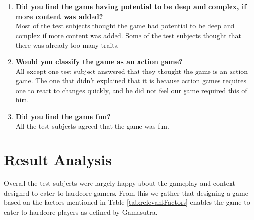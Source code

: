 \begin{enumerate}
\item \textbf{Did you find the game having potential to be deep and complex, if more content was added?}\vspace{4pt}\\
Most of the test subjects thought the game had potential to be deep and complex if more content was added.
Some of the test subjects thought that there was already too many traits.

\item \textbf{Would you classify the game as an action game?}\vspace{4pt}\\
All except one test subject answered that they thought the game is an action game.
The one that didn't explained that it is because action games requires one to react to changes quickly, and he did not feel our game required this of him.

\item \textbf{Did you find the game fun?}\vspace{4pt}\\
All the test subjects agreed that the game was fun.
\end{enumerate}

\section{Result Analysis}
Overall the test subjects were largely happy about the gameplay and content designed to cater to hardcore gamers.
From this we gather that designing a game based on the factors mentioned in Table \ref{tab:relevantFactors} enables the game to cater to hardcore players as defined by Gamasutra\cite{casual_vs_hardcore}.